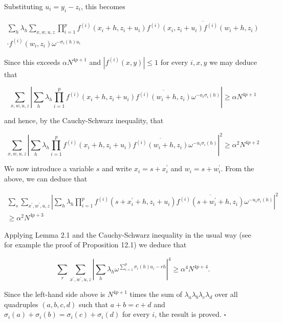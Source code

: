 \documentclass[10pt]{article}
\begin{document}
Substituting $u_{i}=y_{i}-z_{i}$, this becomes

$$
\begin{array}{r}
\sum_{h} \lambda_{h} \sum_{x, w, u, z} \prod_{i=1}^{p} f^{(i)}\left(x_{i}+h, z_{i}+u_{i}\right) \overline{f^{(i)}\left(x_{i}, z_{i}+u_{i}\right) f^{(i)}\left(w_{i}+h, z_{i}\right)} \\
\cdot f^{(i)}\left(w_{i}, z_{i}\right) \omega^{-\sigma_{i}(h) u_{i}}
\end{array}
$$

Since this exceeds $\alpha N^{4 p+1}$ and $\left|f^{(i)}(x, y)\right| \leqslant 1$ for every $i, x, y$ we may deduce that

$$
\sum_{x, w, u, z}\left|\sum_{h} \lambda_{h} \prod_{i=1}^{p} f^{(i)}\left(x_{i}+h, z_{i}+u_{i}\right) \overline{f^{(i)}\left(w_{i}+h, z_{i}\right)} \omega^{-u_{i} \sigma_{i}(h)}\right| \geqslant \alpha N^{4 p+1}
$$

and hence, by the Cauchy-Schwarz inequality, that

$$
\sum_{x, w, u, z}\left|\sum_{h} \lambda_{h} \prod_{i=1}^{p} f^{(i)}\left(x_{i}+h, z_{i}+u_{i}\right) \overline{f^{(i)}\left(w_{i}+h, z_{i}\right)} \omega^{-u_{i} \sigma_{i}(h)}\right|^{2} \geqslant \alpha^{2} N^{4 p+2}
$$

We now introduce a variable $s$ and write $x_{i}=s+x_{i}^{\prime}$ and $w_{i}=s+w_{i}^{\prime}$. From the above, we can deduce that

$$
\begin{array}{r}
\sum_{s} \sum_{x^{\prime}, w^{\prime}, u, z}\left|\sum_{h} \lambda_{h} \prod_{i=1}^{p} f^{(i)}\left(s+x_{i}^{\prime}+h, z_{i}+u_{i}\right) \overline{f^{(i)}\left(s+w_{i}^{\prime}+h, z_{i}\right)} \omega^{-u_{i} \sigma_{i}(h)}\right|^{2} \\
\geqslant \alpha^{2} N^{4 p+3}
\end{array}
$$

Applying Lemma 2.1 and the Cauchy-Schwarz inequality in the usual way (see for example the proof of Proposition 12.1) we deduce that

$$
\sum_{r} \sum_{x^{\prime}, w^{\prime}, u, z}\left|\sum_{h} \lambda_{h} \omega^{\sum_{i=1}^{p}\sigma_{i}(h)u_{i}-r h}\right|^{4} \geqslant \alpha^{4} N^{4 p+4} .
$$

Since the left-hand side above is $N^{4 p+1}$ times the sum of $\lambda_{a} \lambda_{b} \lambda_{c} \lambda_{d}$ over all quadruples $(a, b, c, d)$ such that $a+b=c+d$ and $\sigma_{i}(a)+\sigma_{i}(b)=\sigma_{i}(c)+\sigma_{i}(d)$ for every $i$, the result is proved. \(\square\)
\end{document}
